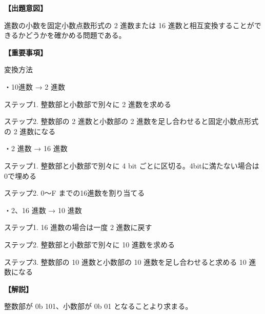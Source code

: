 \noindent \textbf{【出題意図】}

 進数の小数を固定小数点数形式の 2 進数または 16 進数と相互変換することができるかどうかを確かめる問題である。

\vspace{1em}
\noindent \textbf{【重要事項】}

\noindent 変換方法

\medskip
\noindent ・10進数 → 2 進数

\medskip
\noindent ステップ1. 整数部と小数部で別々に 2 進数を求める 

\noindent ステップ2. 整数部の 2 進数と小数部の 2 進数を足し合わせると固定小数点形式の 2 進数になる 

\medskip
\noindent ・2 進数 → 16 進数

\medskip
\noindent ステップ1. 整数部と小数部で別々に 4 bit ごとに区切る。4bitに満たない場合は0で埋める

\noindent ステップ2. 0〜F までの16進数を割り当てる


\medskip
\noindent ・2、16 進数 → 10 進数

\medskip
\noindent ステップ1. 16 進数の場合は一度 2 進数に戻す

\noindent ステップ2. 整数部と小数部で別々に 10 進数を求める 

\noindent ステップ3. 整数部の 10 進数と小数部の 10 進数を足し合わせると求める 10 進数になる 


\vspace{1em}
\noindent \textbf{【解説】}

\noindent 整数部が 0b 101、小数部が 0b 01 となることより求まる。
